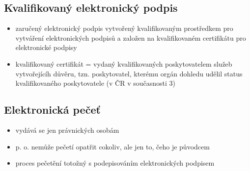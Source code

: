 \subsection{Kvalifikovaný elektronický podpis}
\begin{itemize}
    \item zaručený elektronický podpis vytvořený kvalifikovaným prostředkem pro vytváření elektronických podpisů a založen na kvalifikovaném certifikátu pro elektronické podpisy
    \item kvalifikovaný certifikát = vydaný kvalifikovaných poskytovatelem služeb vytvořejícíh důvěru, tzn. poskytovatel, kterému orgán dohledu udělil status kvalifikovaného poskytovatele (v ČR v současnosti 3)
\end{itemize}

\subsection{Elektronická pečeť}
\begin{itemize}
    \item vydává se jen právnických osobám
    \item p. o. nemůže pečetí opatřit cokoliv, ale jen to, čeho je původcem
    \item proces pečetění totožný s podepisováním elektronických podpisem
\end{itemize}

